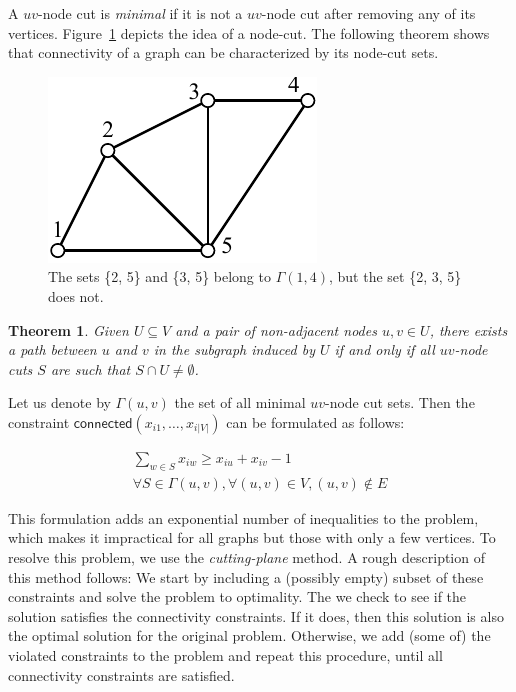 \documentclass[conference,compsoc]{IEEEtran}
\newtheorem{theorem}{Theorem}
\begin{document}
A $uv$-node cut is \emph{minimal} if it is not a $uv$-node cut after removing any of its vertices. Figure~\ref{fig:cutset} depicts the idea of a node-cut. The following theorem shows that connectivity of a graph can be characterized by its node-cut sets. 


\begin{figure}
\centering
\includegraphics[scale=0.7]{images/cutset}
\caption{The sets \{2, 5\} and \{3, 5\} belong to $\Gamma(1, 4)$, but the set \{2, 3, 5\} does not.}
\label{fig:cutset}
\end{figure}

\begin{theorem}
Given $U \subseteq V$ and a pair of non-adjacent nodes $u, v \in U$, there exists a path between $u$ and $v$ in the subgraph induced by $U$ if and only if all $uv$-node cuts $S$ are such that $S \cap U \neq \emptyset$.
\end{theorem}

Let us denote by $\Gamma(u, v)$ the set of all minimal $uv$-node cut sets. Then the constraint $\mathsf{connected}(x_{i1}, \ldots, x_{i|V|})$ can be formulated as follows:

\begin{multline}
\sum_{w \in S} x_{iw} \geq x_{iu} + x_{iv} - 1 \\
\forall S \in \Gamma(u, v), \forall (u, v) \in V, (u, v) \notin E
\label{eq:connectivity}
\end{multline}

This formulation adds an exponential number of inequalities to the
problem, which makes it impractical for all graphs but those with only a
few vertices. To resolve this problem, we use the \emph{cutting-plane}
method. A rough description of this method follows: We start by
including a (possibly empty) subset of these constraints and solve the
problem to optimality. The we check to see if the solution satisfies the
connectivity constraints. If it does, then this solution is also the
optimal solution for the original problem. Otherwise, we add (some of)
the violated constraints to the problem and repeat this procedure, until
all connectivity constraints are satisfied.
\end{document}
